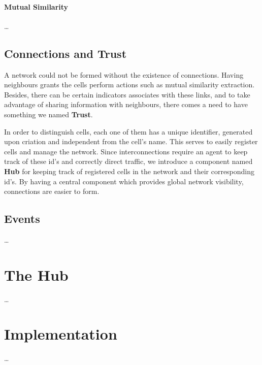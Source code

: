 \paragraph{Mutual Similarity}
\dots

\subsection{Connections and Trust}

A network could not be formed without the existence of connections. Having neighbours grants the cells perform actions such as mutual similarity extraction. Besides, there can be certain indicators associates with these links, and to take advantage of sharing information with neighbours, there comes a need to have something we named \textbf{Trust}.

In order to distinguish cells, each one of them has a unique identifier, generated upon criation and independent from the cell's name. This serves to easily register cells and manage the network. Since interconnections require an agent to keep track of these id's and correctly direct traffic, we introduce a component named \textbf{Hub} for keeping track of registered cells in the network and their corresponding id's. By having a central component which provides global network visibility, connections are easier to form.


\subsection{Events}

\dots


\section{The Hub}

\dots


\section{Implementation}

\dots
